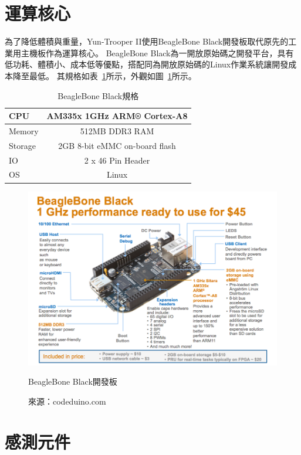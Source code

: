 \section{運算核心}
為了降低體積與重量，Yun-Trooper II使用BeagleBone Black開發板取代原先的工業用主機板作為運算核心。
BeagleBone Black為一開放原始碼之開發平台，具有低功耗、體積小、成本低等優點，搭配同為開放原始碼的Linux作業系統讓開發成本降至最低。
其規格如表~\ref{t:beagleboneblack-specs}所示，外觀如圖~\ref{f:beagleboneblack-specs}所示。

\begin{table}[h!]
	\centering
	\caption{BeagleBone Black規格}
	\label{t:beagleboneblack-specs}
	\begin{tabular}{ | l | c |}
		\hline
		CPU & AM335x 1GHz ARM® Cortex-A8 \\ \hline
		Memory & 512MB DDR3 RAM \\ \hline
		Storage & 2GB 8-bit eMMC on-board flash \\ \hline
		IO & 2 x 46 Pin Header \\ \hline 
		OS & Linux \\
		\hline
	\end{tabular}
\end{table}

\begin{figure}[h!]
	\centering
	\includegraphics[width=\textwidth]{figures/hardware/beagleboneblack-specs}
	\caption{BeagleBone Black開發板}
	\caption*{來源：codeduino.com}
	\label{f:beagleboneblack-specs}
\end{figure}

\section{感測元件}
